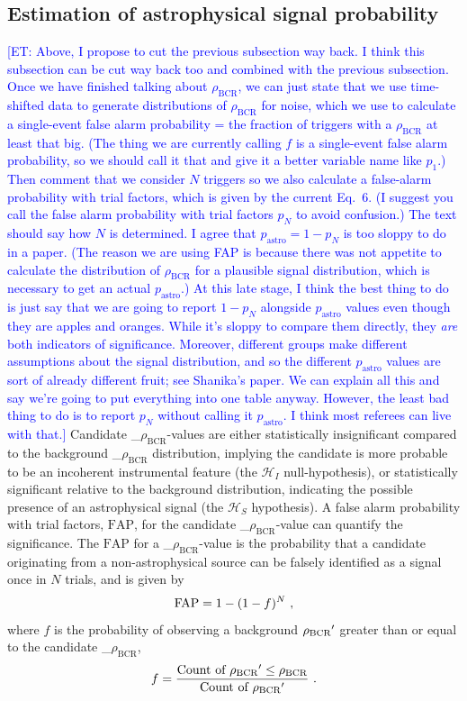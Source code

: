 \documentclass[%
 nofootinbib,
 amsmath,amssymb,
 aps,
 twocolumn,
 superscriptaddress
]{revtex4-2}
\newcommand{\mathcmd}[1]{{\sc \relax\ifmmode#1\else $#1$\fi}\xspace}
\newcommand{\bcr}{\mathcmd{\rho_\text{BCR}}}
\newcommand{\fap}{\mathcmd{\text{FAP}}}
\newcommand{\et}[1]{\textcolor{blue}{[ET: #1]}}
\begin{document}
\subsection{Estimation of astrophysical signal probability}
\et{Above, I propose to cut the previous subsection way back. I think this subsection can be cut way back too and combined with the previous subsection. Once we have finished talking about $\rho_\text{BCR}$, we can just state that we use time-shifted data to generate distributions of $\rho_\text{BCR}$ for noise, which we use to calculate a single-event false alarm probability = the fraction of triggers with a $\rho_\text{BCR}$ at least that big. (The thing we are currently calling $f$ is a single-event false alarm probability, so we should call it that and give it a better variable name like $p_1$.) Then comment that we consider $N$ triggers so we also calculate a false-alarm probability with trial factors, which is given by the current Eq.~6. (I suggest you call the false alarm probability with trial factors $p_N$ to avoid confusion.) The text should say how $N$ is determined. I agree that $p_\text{astro} = 1-p_N$ is too sloppy to do in a paper. (The reason we are using FAP is because there was not appetite to calculate the distribution of $\rho_\text{BCR}$ for a plausible signal distribution, which is necessary to get an actual $p_\text{astro}$.) At this late stage, I think the best thing to do is just say that we are going to report $1-p_N$ alongside $p_\text{astro}$ values even though they are apples and oranges. While it's sloppy to compare them directly, they \textit{are} both indicators of significance. Moreover, different groups make different assumptions about the signal distribution, and so the different $p_\text{astro}$ values are sort of already different fruit; see Shanika's paper. We can explain all this and say we're going to put everything into one table anyway. However, the least bad thing to do is to report $p_N$ without calling it $p_\text{astro}$. I think most referees can live with that.}
Candidate \bcr-values are either statistically insignificant compared to the background \bcr distribution, implying the candidate is more probable to be an incoherent instrumental feature (the $\mathcal{H}_I$ null-hypothesis), or statistically significant relative to the background distribution, indicating the possible presence of an astrophysical signal (the $\mathcal{H}_S$ hypothesis). A false alarm probability with trial factors, \fap, for the candidate \bcr-value can quantify the significance. The \fap for a \bcr-value is the probability that a candidate originating from a non-astrophysical source can be falsely identified as a signal once in $N$ trials, and is given by 
\begin{equation}
    \fap = 1 - (1-f)^N \ ,
\end{equation}
where $f$ is the probability of observing a background $\bcr'$ greater than or equal to the candidate \bcr,
\begin{equation}
    f = \frac{\text{Count of } \bcr' \leq \bcr}{\text{Count of } \bcr'} \ .
\end{equation}
\end{document}
